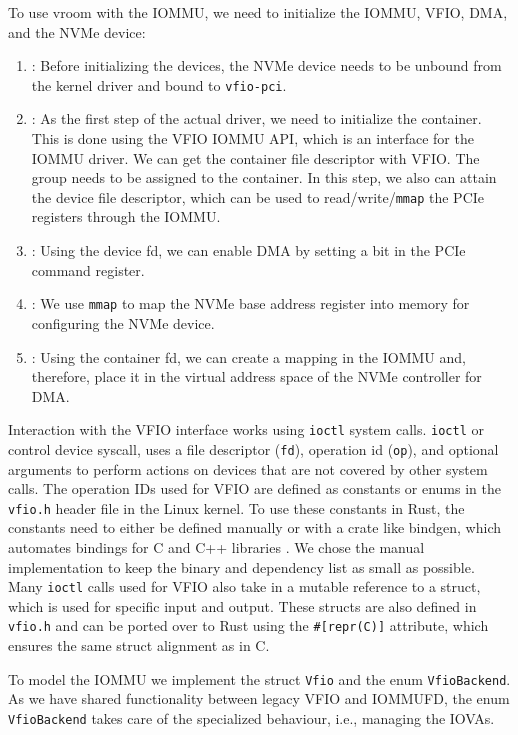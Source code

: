 To use vroom with the IOMMU, we need to initialize the IOMMU, VFIO, DMA, and the NVMe device:
\begin{enumerate}
    \item \textbf{}: Before initializing the devices, the NVMe device needs to be unbound from the kernel driver and bound to \texttt{vfio-pci}.
    \item \textbf{}: As the first step of the actual driver, we need to initialize the container. This is done using the VFIO IOMMU API, which is an interface for the IOMMU driver. We can get the container file descriptor with VFIO. The group needs to be assigned to the container. In this step, we also can attain the device file descriptor, which can be used to read/write/\texttt{mmap} the PCIe registers through the IOMMU.
    \item \textbf{}: Using the device fd, we can enable DMA by setting a bit in the PCIe command register.
    \item \textbf{}: We use \texttt{mmap} to map the NVMe base address register into memory for configuring the NVMe device.
    \item \textbf{}: Using the container fd, we can create a mapping in the IOMMU and, therefore, place it in the virtual address space of the NVMe controller for DMA.
\end{enumerate}

Interaction with the VFIO interface works using \texttt{ioctl} system calls.
\texttt{ioctl} or control device syscall, uses a file descriptor (\texttt{fd}), operation id (\texttt{op}), and optional arguments to perform actions on devices that are not covered by other system calls.
The operation IDs used for VFIO are defined as constants or enums in the \texttt{vfio.h} header file in the Linux kernel. To use these constants in Rust, the constants need to either be defined manually or with a crate like bindgen, which automates bindings for C and C++ libraries \cite{cratebindgen}. We chose the manual implementation to keep the binary and dependency list as small as possible.
Many \texttt{ioctl} calls used for VFIO also take in a mutable reference to a struct, which is used for specific input and output. These structs are also defined in \texttt{vfio.h} and can be ported over to Rust using the \texttt{\#[repr(C)]} attribute, which ensures the same struct alignment as in C.

To model the IOMMU we implement the struct \texttt{Vfio} and the enum \texttt{VfioBackend}. As we have shared functionality between legacy VFIO and IOMMUFD, the enum \texttt{VfioBackend} takes care of the specialized behaviour, i.e., managing the IOVAs.

